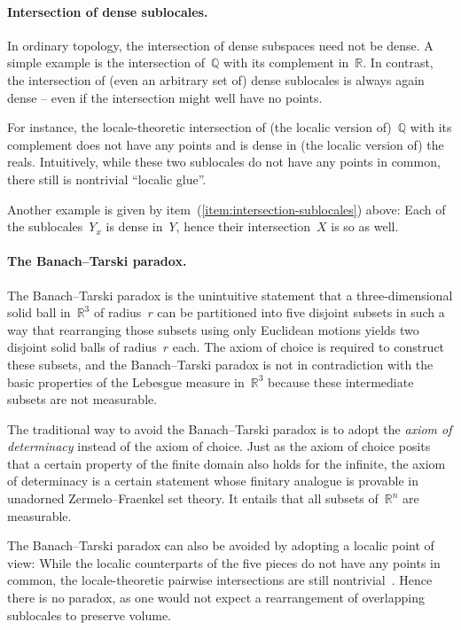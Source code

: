 \documentclass{ws-rv9x6}
\newcommand{\QQ}{\mathbb{Q}}
\newcommand{\RR}{\mathbb{R}}
\renewcommand{\_}{\mathpunct{.}}
\newcommand{\?}{\,{:}\,}
\begin{document}
\paragraph{Intersection of dense sublocales.} In ordinary topology, the
intersection of dense subspaces need not be dense. A simple example is the
intersection of~$\QQ$ with its complement in~$\RR$. In contrast, the
intersection of (even an arbitrary set of) dense sublocales is always again
dense -- even if the intersection might well have no points.

For instance, the locale-theoretic intersection of (the localic version
of)~$\QQ$ with its complement does not have any points and is dense in (the
localic version of) the reals. Intuitively, while these two sublocales do not
have any points in common, there still is nontrivial ``localic glue''.


Another example is given by item~(\ref{item:intersection-sublocales}) above:
Each of the sublocales~$Y_x$ is dense in~$Y$, hence their intersection~$X$ is
so as well.


\paragraph{The Banach--Tarski paradox.} The Banach--Tarski paradox is the
unintuitive statement that a three-dimensional solid ball in~$\RR^3$ of
radius~$r$ can be partitioned into five disjoint subsets in such a way that
rearranging those subsets using only Euclidean motions yields two disjoint
solid balls of radius~$r$ each. The axiom of choice is required to construct
these subsets, and the Banach--Tarski paradox is not in
contradiction with the basic properties of the Lebesgue measure in~$\RR^3$
because these intermediate subsets are not measurable.

The traditional way to avoid the Banach--Tarski paradox is to adopt the
\emph{axiom of determinacy} instead of the axiom of choice. Just as the axiom
of choice posits that a certain property of the finite domain also holds for the
infinite, the axiom of determinacy is a certain statement whose finitary
analogue is provable in unadorned Zermelo--Fraenkel set theory. It entails that
all subsets of~$\RR^n$ are measurable.

The Banach--Tarski paradox can also be avoided by adopting a localic point of
view: While the localic counterparts of the five pieces do not have any points
in common, the locale-theoretic pairwise intersections are still nontrivial~\cite{simpson:measure}.
Hence there is no paradox, as one would not expect a rearrangement of
overlapping sublocales to preserve volume.
\end{document}
